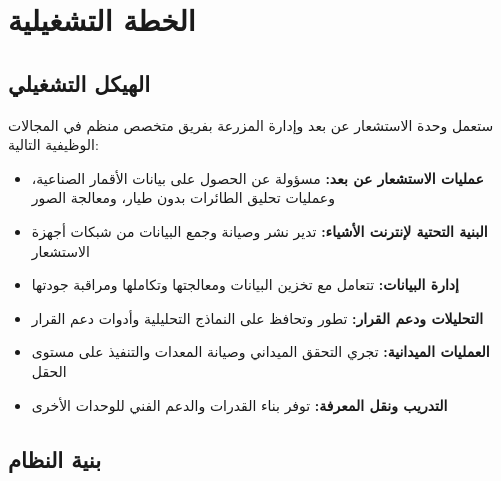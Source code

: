 \section{الخطة التشغيلية}

\subsection{الهيكل التشغيلي}
ستعمل وحدة الاستشعار عن بعد وإدارة المزرعة بفريق متخصص منظم في المجالات الوظيفية التالية:

\begin{itemize}
    \item \textbf{عمليات الاستشعار عن بعد:} مسؤولة عن الحصول على بيانات الأقمار الصناعية، وعمليات تحليق الطائرات بدون طيار، ومعالجة الصور
    
    \item \textbf{البنية التحتية لإنترنت الأشياء:} تدير نشر وصيانة وجمع البيانات من شبكات أجهزة الاستشعار
    
    \item \textbf{إدارة البيانات:} تتعامل مع تخزين البيانات ومعالجتها وتكاملها ومراقبة جودتها
    
    \item \textbf{التحليلات ودعم القرار:} تطور وتحافظ على النماذج التحليلية وأدوات دعم القرار
    
    \item \textbf{العمليات الميدانية:} تجري التحقق الميداني وصيانة المعدات والتنفيذ على مستوى الحقل
    
    \item \textbf{التدريب ونقل المعرفة:} توفر بناء القدرات والدعم الفني للوحدات الأخرى
\end{itemize}

\subsection{بنية النظام}

